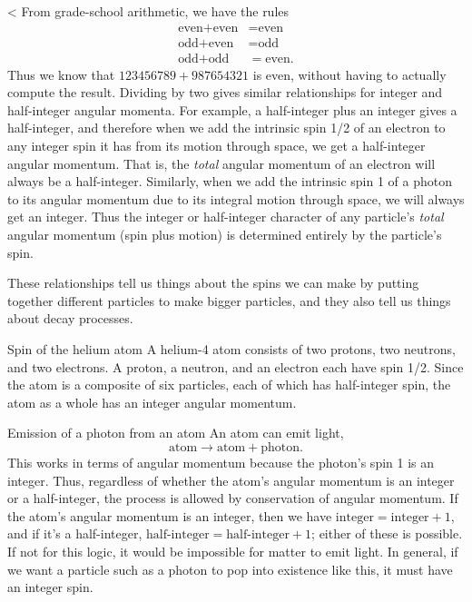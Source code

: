 <%
From grade-school arithmetic, we have the rules
\begin{align*}
  \text{even}+\text{even} &= \text{even} \\
  \text{odd}+\text{even} &= \text{odd} \\
  \text{odd}+\text{odd} &= \text{even}.
\end{align*}
Thus we know that $123456789+987654321$ is even, without having to actually compute the result.
Dividing by two gives similar relationships for integer and half-integer angular momenta.
For example, a half-integer plus an integer gives a half-integer, and therefore when we add
the intrinsic spin 1/2 of an electron to any integer spin it has from its motion through space,
we get a half-integer angular momentum. That is, the \emph{total} angular momentum of an electron
will always be a half-integer. Similarly, when we add the intrinsic spin 1 of a photon to its
angular momentum due to its integral motion through space, we will always get an integer. Thus
the integer or half-integer character of any particle's \emph{total} angular momentum (spin
plus motion) is determined entirely by the particle's spin.

These relationships tell us things about the spins we can make by putting together different
particles to make bigger particles, and they also tell us things about decay processes.

\begin{eg}{Spin of the helium atom}
A helium-4 atom consists of two protons, two neutrons, and two electrons.
A proton, a neutron, and an electron each have spin 1/2. Since the atom is
a composite of six particles, each of which has half-integer spin, the atom as
a whole has an integer angular momentum.
\end{eg}

\begin{eg}{Emission of a photon from an atom}
An atom can emit light,
\begin{equation*}
  \text{atom} \rightarrow \text{atom}+\text{photon}.
\end{equation*}
This works in terms of angular momentum because the photon's spin 1 is an integer.
Thus, regardless of whether the atom's angular momentum is an integer or a half-integer,
the process is allowed by conservation of angular momentum. If the atom's angular momentum
is an integer, then we have $\text{integer}=\text{integer}+1$, and if it's
a half-integer, $\text{half-integer}=\text{half-integer}+1$; either of these is possible.
If not for this logic, it would be impossible for matter to emit light. In general,
if we want a particle such as a photon to pop into existence like this, it must
have an integer spin.
\end{eg}

